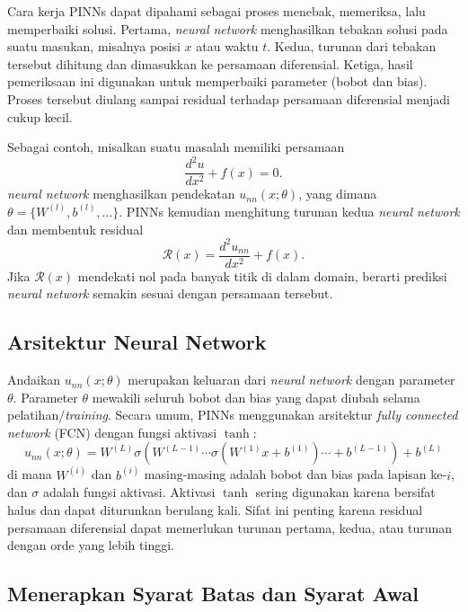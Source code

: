 \documentclass[12pt, letterpaper]{article}
\begin{document}
Cara kerja PINNs dapat dipahami sebagai proses menebak, memeriksa, lalu
memperbaiki solusi. Pertama, \textit{neural network} menghasilkan tebakan solusi pada
suatu masukan, misalnya posisi $x$ atau waktu $t$. Kedua, turunan dari tebakan
tersebut dihitung dan dimasukkan ke persamaan diferensial. Ketiga, hasil
pemeriksaan ini digunakan untuk memperbaiki parameter (bobot dan bias). Proses tersebut
diulang sampai residual terhadap persamaan diferensial menjadi cukup kecil.

Sebagai contoh, misalkan suatu masalah memiliki persamaan
\begin{equation}
    \frac{d^2u}{dx^2}+f(x)=0.
\end{equation}
\textit{neural network} menghasilkan pendekatan $u_{nn}(x;\theta)$, yang dimana $\theta = \{W^{(l)},b^{(l)},\dots\}$. PINNs kemudian menghitung turunan kedua \textit{neural network} dan membentuk residual
\begin{equation}
    \mathcal{R}(x)=\frac{d^2u_{nn}}{dx^2}+f(x).
\end{equation}
Jika $\mathcal{R}(x)$ mendekati nol pada banyak titik di dalam domain, berarti
prediksi \textit{neural network} semakin sesuai dengan persamaan tersebut.

\subsection{Arsitektur Neural Network}
Andaikan $u_{nn}(x;\theta)$ merupakan keluaran dari \textit{neural network}
dengan parameter $\theta$. Parameter $\theta$ mewakili seluruh bobot dan bias
yang dapat diubah selama pelatihan/\textit{training}. Secara umum, PINNs menggunakan arsitektur
\textit{fully connected network} (FCN) dengan fungsi aktivasi $\tanh$:
\begin{equation}
    u_{nn}(x;\theta) = W^{(L)} \sigma(W^{(L-1)} \cdots \sigma(W^{(1)} x + b^{(1)}) \cdots + b^{(L-1)}) + b^{(L)}
\end{equation}
di mana $W^{(i)}$ dan $b^{(i)}$ masing-masing adalah bobot dan bias pada lapisan ke-$i$,
dan $\sigma$ adalah fungsi aktivasi. Aktivasi $\tanh$ sering digunakan karena
bersifat halus dan dapat diturunkan berulang kali. Sifat ini penting karena
residual persamaan diferensial dapat memerlukan turunan pertama, kedua, atau
turunan dengan orde yang lebih tinggi.

\subsection{Menerapkan Syarat Batas dan Syarat Awal}
\end{document}
